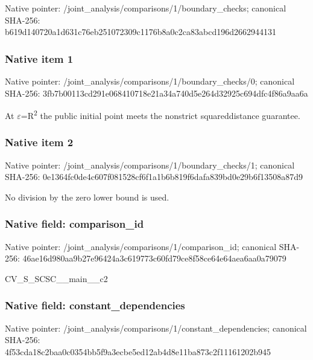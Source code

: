 \documentclass[10pt,a4paper]{article}
\begin{document}
Native pointer: /joint\_analysis/comparis\allowbreak{}ons/1/boundary\_checks; canonical SHA-256: b619d140720a1d631c76eb25\allowbreak{}1072309c1176b8a0c2ca83ab\allowbreak{}cd196d2662944131



\subsubsection{Native item 1}


Native pointer: /joint\_analysis/comparis\allowbreak{}ons/1/boundary\_checks/0; canonical SHA-256: 3fb7b00113cd291e06841071\allowbreak{}8e21a34a740d5e264d32925c\allowbreak{}694dfc4f86a9aa6a


At \ensuremath{\varepsilon}=R\textsuperscript{2} the public initial point meets the nonstrict squareddistance guarantee.


\subsubsection{Native item 2}


Native pointer: /joint\_analysis/comparis\allowbreak{}ons/1/boundary\_checks/1; canonical SHA-256: 0e1364fc0de4c607f081528c\allowbreak{}f6f1a1b6b819f6dafa839bd0\allowbreak{}e29b6f13508a87d9


No division by the zero lower bound is used.


\subsubsection{Native field: comparison\_id}


Native pointer: /joint\_analysis/comparis\allowbreak{}ons/1/comparison\_id; canonical SHA-256: 46ae16d980aa9b27e96424a3\allowbreak{}c619773c60fd79ce8f58ce64\allowbreak{}e64aea6aa0a79079


CV\_S\_SCSC\_\_main\_\_c2


\subsubsection{Native field: constant\_dependencies}


Native pointer: /joint\_analysis/comparis\allowbreak{}ons/1/constant\_dependenc\allowbreak{}ies; canonical SHA-256: 4f53cda18c2baa0c0354bb5f\allowbreak{}9a3ecbe5ed12ab4d8e11ba87\allowbreak{}3c2f11161202b945
\end{document}
